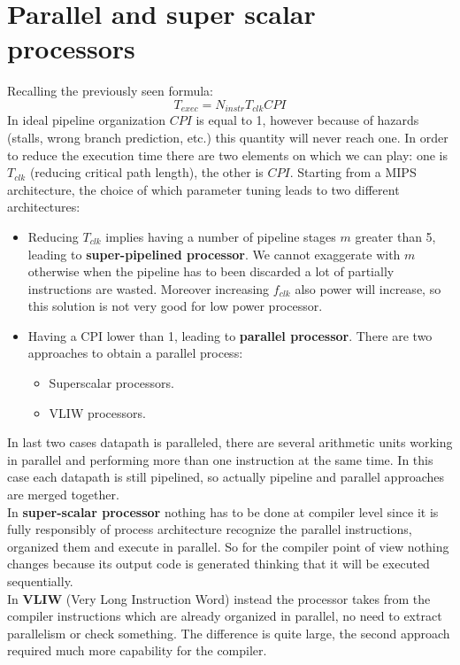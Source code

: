\chapter{Parallel and super scalar processors}

Recalling the previously seen formula:
$$T_{exec}=N_{instr}T_{clk} CPI$$
In ideal pipeline organization $CPI$ is equal to 1, however because of hazards
(stalls, wrong branch prediction, etc.) this quantity will never reach one. In
order to reduce the execution time there are two elements on which we can play:
one is $T_{clk}$ (reducing critical path length), the other is $CPI$. Starting
from a MIPS architecture, the choice of which parameter tuning leads to two
different architectures:
\begin{itemize}
  \item Reducing $T_{clk}$ implies having a number of pipeline stages $m$
    greater than 5, leading to \textbf{super-pipelined processor}. We cannot
    exaggerate with $m$ otherwise when the pipeline has to been discarded a lot
    of partially instructions are wasted. Moreover increasing $f_{clk}$ also
    power will increase, so this solution is not very good for low power
    processor.
  \item Having a CPI lower than 1, leading to \textbf{parallel processor}.
    There are two approaches to obtain a parallel process:
    \begin{itemize}
      \item Superscalar processors.
      \item VLIW processors.
    \end{itemize}
\end{itemize}
In last two cases datapath is paralleled, there are several arithmetic units
working in parallel and performing more than one instruction at the same time.
In this case each datapath is still pipelined, so actually pipeline and
parallel approaches are merged together.\\ In \textbf{super-scalar processor}
nothing has to be done at compiler level since it is fully responsibly of
process architecture recognize the parallel instructions, organized them and
execute in parallel. So for the compiler point of view nothing changes because
its output code is generated thinking that it will be executed sequentially.\\
In \textbf{VLIW} (Very Long Instruction Word) instead the processor takes from
the compiler instructions which are already organized in parallel, no need to
extract parallelism or check something. The difference is quite large, the
second approach required much more capability for the compiler.
\newpage

